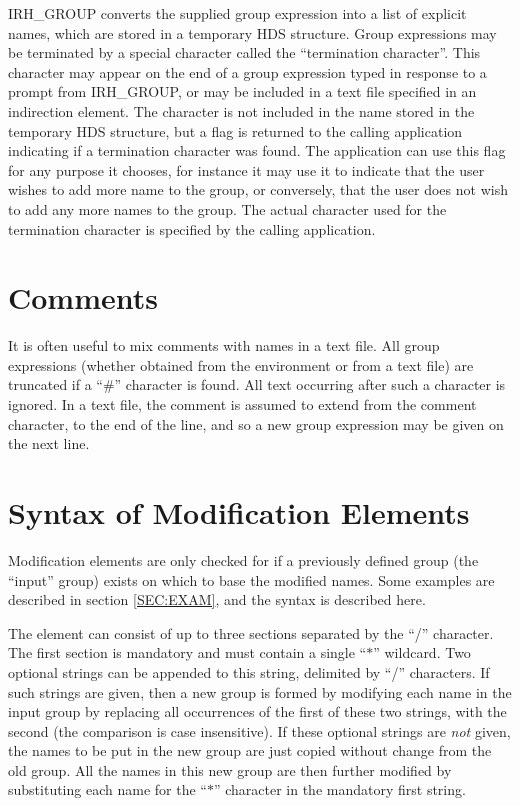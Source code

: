 IRH\_GROUP converts the supplied group expression into a list of explicit names,
which are stored in a temporary HDS structure. Group expressions may be
terminated by a special character called the ``termination character''. This
character may appear on the end of a group expression typed in response to a
prompt from IRH\_GROUP, or may be included in a text file specified in an
indirection element. The character is not included in the name stored in the
temporary HDS structure, but a flag is returned to the calling application
indicating if a termination character was found. The application can use this
flag for any purpose it chooses, for instance it may use it to indicate that the
user wishes to add more name to the group, or conversely, that the user does not
wish to add any more names to the group. The actual character used for the
termination character is specified by the calling application. 

\section {Comments}
It is often useful to mix comments with names in a text file. All group
expressions (whether obtained from the environment or from a text file) are
truncated if a ``\#'' character is found. All text occurring after such
a character is ignored. In a text file, the comment is assumed to extend
from the comment character, to the end of the line, and so a new group
expression may be given on the next line. 

\section {Syntax of Modification Elements}
\label {SEC:MOD}

Modification elements are only checked for if a previously 
defined group (the ``input'' group) exists on which to base the modified names.
Some examples are described in section \ref {SEC:EXAM}, and the syntax is 
described here.

The element can consist of up to three sections separated by the ``/''
character. The first section is mandatory and must contain a single ``$*$''
wildcard. Two optional strings can be appended to this string, delimited by
``/'' characters. If such strings are given, then a new group is formed by
modifying each name in the input group by replacing all occurrences of the first
of these two strings, with the second (the comparison is case insensitive). If
these optional strings are {\em not} given, the names to be put in the new group
are just copied without change from the old group. All the names in this new
group are then further modified by substituting each name for the ``$*$''
character in the mandatory first string. 

